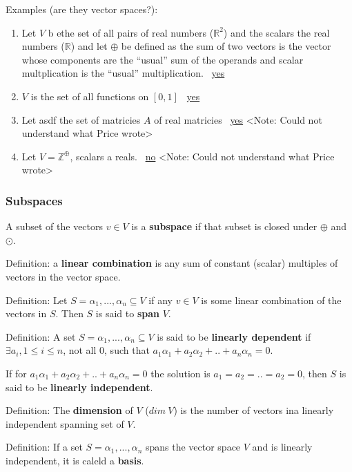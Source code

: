 Examples (are they vector spaces?):

\begin{enumerate}
  \item Let $V$ b ethe set of all pairs of real numbers ($\mathbb{R} ^ 2$) and the scalars the real numbers ($\mathbb{R}$) and let $\oplus$ be defined as the sum of two vectors is the vector whose components are the ``usual'' sum of the operands and scalar multplication is the ``usual'' multiplication. \textrightarrow\ \underline{yes}

  \item $V$ is the set of all functions on $[0,1]$ \textrightarrow\ \underline{yes}

  \item Let asdf the set of matricies $A$ of real matricies \textrightarrow\ \underline{yes} <Note: Could not understand what Price wrote>

  \item Let $V = \mathbb{Z}^\oplus$, scalars a reals. \textrightarrow\ \underline{no} <Note: Could not understand what Price wrote>
\end{enumerate}


\subsubsection{Subspaces}

A subset of the vectors $v \in V$ is a \textbf{subspace} if that subset is closed under $\oplus$ and $\odot$.

Definition: a \textbf{linear combination} is any sum of constant (scalar) multiples of vectors in the vector space.

Definition: Let $S = {\alpha_1, ..., \alpha_n} \subseteq V$ if any $v \in V$ is some linear combination of the vectors in $S$. Then $S$ is said to \textbf{span} $V$.

Definition: A set $S = {\alpha_1, ..., \alpha_n} \subseteq V$ is said to be \textbf{linearly dependent} if $\exists a_i, 1 \leq i \leq n$, not all 0, such that $a_1 \alpha_1 + a_2 \alpha_2 + .. + a_n \alpha_n = 0$.

If for $a_1 \alpha_1 + a_2 \alpha_2 + .. + a_n \alpha_n = 0$ the solution is $a_1 = a_2 = .. = a_2 = 0$, then $S$ is said to be \textbf{linearly independent}.

Definition: The \textbf{dimension} of $V$ ($dim\ V$) is the number of vectors ina  linearly independent spanning set of $V$.

Definition: If a set $S = {\alpha_1, ..., \alpha_n}$ spans the vector space $V$ and is linearly independent, it is caleld a \textbf{basis}.